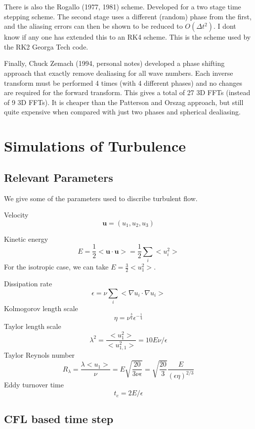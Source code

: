 \documentclass[12pt]{article}
\newcommand{\uv}{\mathbf u}
\newcommand{\grad}{\nabla}
\begin{document}
There is also the Rogallo (1977, 1981) scheme.  Developed for a two
stage time stepping scheme.  The second stage uses a different (random) phase
from the first, and the aliasing errors can then be shown to be
reduced to $O(\Delta t^2)$.  I dont know if any one has extended this
to an RK4 scheme.  This is the scheme used by the RK2 Georga Tech
code.  

Finally, Chuck Zemach (1994, personal notes) developed
a phase shifting approach that exactly remove dealiasing for all wave numbers.  
Each inverse transform must be performed 4 times (with 4 different phases)
and no changes are required for the forward transform.  This gives a total of
27 3D FFTs (instead of 9 3D FFTs).  It is cheaper than the Patterson and Orszag approach, 
but still quite expensive when compared with just two phases and spherical
dealiasing.  



\section{Simulations of Turbulence}


\subsection{Relevant Parameters}
We give some of the parameters used to discribe turbulent flow.

Velocity
\[
\uv = \left( u_1, u_2, u_3 \right)
\]

Kinetic energy
\[
E=\frac12 < \uv \cdot \uv > = \frac12   \sum_i < u_i^2 > 
\]
For the isotropic case, we can take $E=\frac32 <u_1^2 >$.

Dissipation rate
\[
\epsilon = \nu \sum_i < \grad u_i \cdot \grad u_i >
\]
Kolmogorov length scale
\[
\eta = {\nu^{\frac34}}  {\epsilon^{-\frac14}} 
\]
Taylor length scale
\[
\lambda^2 =   \frac{ <u^2_1>  } { <u^2_{1,1}> }  = 10 E \nu / \epsilon
\]
Taylor Reynols number
\begin{equation}
R_\lambda = \frac{\lambda < u_1 > }{\nu} = E \sqrt{\frac{20}{3 \nu \epsilon}  }
= \sqrt{\frac{20}{3}}  \frac{E}{(\epsilon \eta)^{2/3}}
\label{E:Rlambda}
\end{equation}
Eddy turnover time
\begin{equation}
t_e = 2 E / \epsilon
\label{E:Teddy}
\end{equation}

\subsection{CFL based time step}
\end{document}
